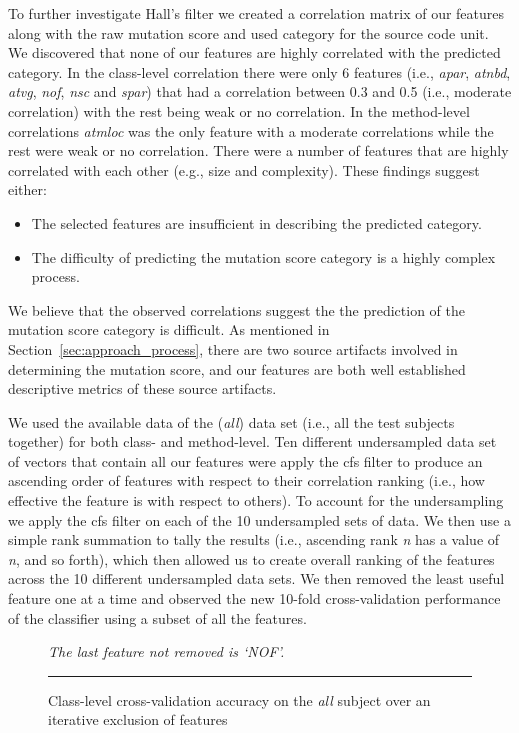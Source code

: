 To further investigate Hall's filter we created a correlation matrix of our features along with the raw mutation score and used category for the source code unit. We discovered that none of our features are highly correlated with the predicted category. In the class-level correlation there were only 6 features (i.e., \emph{apar}, \emph{atnbd}, \emph{atvg}, \emph{nof}, \emph{nsc} and \emph{spar}) that had a correlation between 0.3 and 0.5 (i.e., moderate correlation) with the rest being weak or no correlation. In the method-level correlations \emph{atmloc} was the only feature with a moderate correlations while the rest were weak or no correlation. There were a number of features that are highly correlated with each other (e.g., size and complexity). These findings suggest either:

\begin{itemize}
  \item The selected features are insufficient in describing the predicted category.
  \item The difficulty of predicting the mutation score category is a highly complex process.
\end{itemize}

We believe that the observed correlations suggest the the prediction of the mutation score category is difficult. As mentioned in Section~\ref{sec:approach_process}, there are two source artifacts involved in determining the mutation score, and our features are both well established descriptive metrics of these source artifacts.

We used the available data of the (\emph{all}) data set (i.e., all the test subjects together) for both class- and method-level. Ten different undersampled data set of vectors that contain all our features were apply the \gls{cfs} filter to produce an ascending order of features with respect to their correlation ranking (i.e., how effective the feature is with respect to others). To account for the undersampling we apply the \gls{cfs} filter on each of the 10 undersampled sets of data. We then use a simple rank summation to tally the results (i.e., ascending rank \emph{n} has a value of \emph{n}, and so forth), which then allowed us to create overall ranking of the features across the 10 different undersampled data sets. We then removed the least useful feature one at a time and observed the new 10-fold cross-validation performance of the classifier using a subset of all the features.

\begin{figure}[ht!]
  \centering
  \begin{adjustbox}{max size={.95\textwidth}{.95\textheight}}
    
  \end{adjustbox}
  \caption{Class-level cross-validation accuracy on the \emph{all} subject over an iterative exclusion of features}
  \vspace{1mm}
  \footnotesize{\emph{The last feature not removed is `NOF'.}}
  \vspace{2mm}
  \hrule
  \label{fig:cross_validation_feature_selection_class_graph}
\end{figure}

